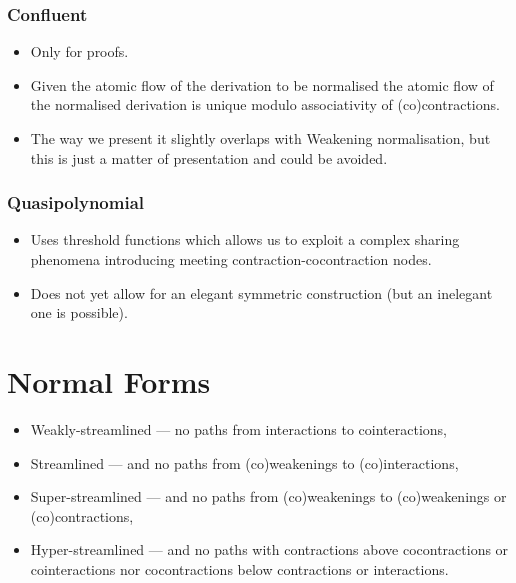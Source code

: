\documentclass[12pt]{article}
\begin{document}
\subsubsection{Confluent}

\begin{itemize}
\item Only for proofs.
\item Given the atomic flow of the derivation to be normalised the atomic flow of the normalised derivation is unique modulo associativity of (co)contractions.
\item The way we present it slightly overlaps with Weakening normalisation, but this is just a matter of presentation and could be avoided.
\end{itemize}

\subsubsection{Quasipolynomial}

\begin{itemize}
\item Uses threshold functions which allows us to exploit a complex sharing phenomena introducing meeting contraction-cocontraction nodes.
\item Does not yet allow for an elegant symmetric construction (but an inelegant one is possible).
\end{itemize}

\section{Normal Forms}

\begin{itemize}
\item Weakly-streamlined --- no paths from interactions to cointeractions,
\item Streamlined --- and no paths from (co)weakenings to (co)interactions,
\item Super-streamlined --- and no paths from (co)weakenings to (co)weakenings or (co)contractions,
\item Hyper-streamlined --- and no paths with contractions above cocontractions or cointeractions nor cocontractions below contractions or interactions.
\end{itemize}
\end{document}
